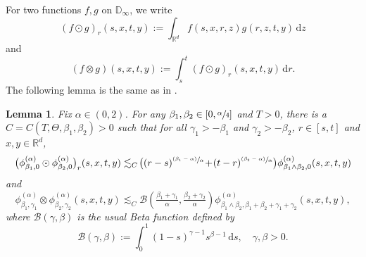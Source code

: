 \documentclass[11pt]{article}
\numberwithin{equation}{section}\providecommand{\asymp}{\mathrel{\sim}}
\newcommand{\psfrac}[2]{\sfrac{(#1)}{#2}}
\theoremstyle{plain}
\newtheorem{lemma}[theorem]{Lemma}
\theoremstyle{definition}
\newcommand\cB{{\mathcal B}}
\newcommand\mD{\mathbb{D}}
\newcommand\mR{\mathbb{R}}
\newcommand\1{{\mathbf{1}}}
\newcommand{\dif}{\,\mathrm{d}}
\begin{document}
For two functions $f,g$ on $\mD_\infty$, we write
\[
(f\odot g)_r(s,x,t,y):=\int_{\mR^d} f(s,x,r,z)g(r,z,t,y)\dif z
\]
and\vspace*{-3pt}
\[
(f\otimes g)(s,x,t,y):=\int^t_s(f\odot g)_r(s,x,t,y)\dif r.
\]
The following lemma is the same as in \cite[Lem.\,2.1]{Ch-Zh}.
\begin{lemma}\label{Le09} Fix $\alpha\in (0,2) $.
For any $\beta_1,\beta_2\in[0,\sfrac{\alpha}{4}]$ and $T>0$,
there is a $C=C(T,\Theta,\beta_1,\beta_2)>0$ such that
for all $\gamma_1>-\beta_1$ and $\gamma_2>-\beta_2$, $r\in[s,t]$ and $x,y\in \mR^d $,%
\begin{equation}\label{eq30}
\bigl(\phi^{(\alpha)}_{\beta_1,0}\odot\phi^{(\alpha)}_{\beta_2,0}\bigr)_r(s,x,t,y)
\lesssim_{C}\! \bigl((r-s)^{\psfrac{\beta_1-\alpha}{\alpha}}\!+\!(t-r)^{\psfrac{\beta_2-\alpha}{\alpha}}\bigr)
\phi^{(\alpha)}_{\beta_1\wedge\beta_2,0}(s,x,t,y)
\end{equation}
and\vspace*{-3pt}
\begin{equation}\label{eq31}
\phi^{(\alpha)}_{\beta_1,\gamma_1}\otimes\phi^{(\alpha)}_{\beta_2,\gamma_2} (s,x,t,y)
\lesssim_{C} \cB(\tfrac{\beta_1+\gamma_1}{\alpha},\tfrac{\beta_2+\gamma_2}{\alpha})
\phi^{(\alpha)}_{\beta_1\wedge\beta_2,\beta_1+\beta_2+\gamma_1+\gamma_2}(s,x,t,y),
\end{equation}
where $\cB(\gamma,\beta)$ is the usual Beta function defined by
\[
\cB(\gamma,\beta):=\int^1_0(1-s)^{\gamma-1}s^{\beta-1}\dif s,\quad \gamma,\beta>0.
\]
\end{lemma}
\end{document}
